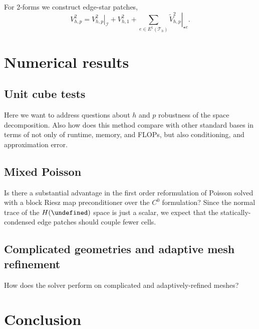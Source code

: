 \documentclass[review,onefignum,onetabnum,a4paper]{siamart190516}
\let\div\undefined
\DeclareMathOperator{\div}{div}
\newcommand{\Hdiv}{H(\div)}
\newcommand{\mesh}{\mathcal{T}_h}
\begin{document}
For 2-forms we construct edge-star patches,
\begin{equation}
   V^2_{h,p} = \left.V^2_{h,p}\right|_\mathcal{I} +  V^2_{h,1} 
   + \sum_{e\in E^1(\mesh)} \left.\tilde{V}^2_{h,p}\right|_{\star e}. 
\end{equation}



\section{Numerical results} \label{sec:results}

\subsection{Unit cube tests}
Here we want to address questions about $h$ and $p$ robustness of the space
decomposition. Also how does this method compare with other standard bases in
terms of not only of runtime, memory, and FLOPs, but also conditioning, and
approximation error.

\subsection{Mixed Poisson}
Is there a substantial advantage in the first order reformulation of Poisson solved
with a block Riesz map preconditioner over the $C^0$ formulation?
Since the normal trace of the $\Hdiv$ space is just a scalar, we expect that the
statically-condensed edge patches should couple fewer cells.


\subsection{Complicated geometries and adaptive mesh refinement}
How does the solver perform on complicated and adaptively-refined meshes?


\section{Conclusion} \label{sec:conclusion}





\end{document}

